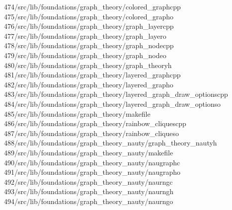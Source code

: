 \begin{tabbing}
474\>/src/lib/foundations/graph\_theory/colored\_graphcpp\\[0pt]
475\>/src/lib/foundations/graph\_theory/colored\_grapho\\[0pt]
476\>/src/lib/foundations/graph\_theory/graph\_layercpp\\[0pt]
477\>/src/lib/foundations/graph\_theory/graph\_layero\\[0pt]
478\>/src/lib/foundations/graph\_theory/graph\_nodecpp\\[0pt]
479\>/src/lib/foundations/graph\_theory/graph\_nodeo\\[0pt]
480\>/src/lib/foundations/graph\_theory/graph\_theoryh\\[0pt]
481\>/src/lib/foundations/graph\_theory/layered\_graphcpp\\[0pt]
482\>/src/lib/foundations/graph\_theory/layered\_grapho\\[0pt]
483\>/src/lib/foundations/graph\_theory/layered\_graph\_draw\_optionscpp\\[0pt]
484\>/src/lib/foundations/graph\_theory/layered\_graph\_draw\_optionso\\[0pt]
485\>/src/lib/foundations/graph\_theory/makefile\\[0pt]
486\>/src/lib/foundations/graph\_theory/rainbow\_cliquescpp\\[0pt]
487\>/src/lib/foundations/graph\_theory/rainbow\_cliqueso\\[0pt]
488\>/src/lib/foundations/graph\_theory\_nauty/graph\_theory\_nautyh\\[0pt]
489\>/src/lib/foundations/graph\_theory\_nauty/makefile\\[0pt]
490\>/src/lib/foundations/graph\_theory\_nauty/naugraphc\\[0pt]
491\>/src/lib/foundations/graph\_theory\_nauty/naugrapho\\[0pt]
492\>/src/lib/foundations/graph\_theory\_nauty/naurngc\\[0pt]
493\>/src/lib/foundations/graph\_theory\_nauty/naurngh\\[0pt]
494\>/src/lib/foundations/graph\_theory\_nauty/naurngo\\[0pt]

\end{tabbing}
